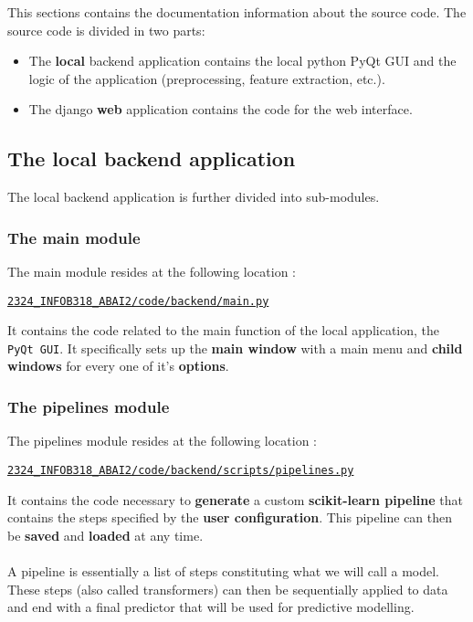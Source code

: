 \label{sec:source-code-documentation}
This sections contains the documentation information about the source code. The source code is divided in two parts:

\begin{itemize}
    \item The \textbf{local} backend application contains the local python PyQt GUI and the logic of the application (preprocessing, feature extraction, etc.).
    \item The django \textbf{web} application contains the code for the web interface.
\end{itemize}
\subsection{The local backend application}
The local backend application is further divided into sub-modules.

\subsubsection{The main module}
The main module resides at the following location : 
\begin{codebox}
    \large\href{https://github.com/UNamurCSFaculty/2324_INFOB318_ABAI2/blob/main/code/backend/main.py}{\texttt{2324\_INFOB318\_ABAI2/code/backend/main.py}}
\end{codebox}
It contains the code related to the main function of the local application, the \texttt{PyQt GUI}. It specifically sets up the \textbf{main window} with a main menu and \textbf{child windows} for every one of it's \textbf{options}.

\subsubsection{The pipelines module}
\label{subsubsec:pipelines}
The pipelines module resides at the following location : 
\begin{codebox}
    \large\href{https://github.com/UNamurCSFaculty/2324_INFOB318_ABAI2/blob/main/code/backend/scripts/pipelines.py}{\texttt{2324\_INFOB318\_ABAI2/code/backend/scripts/pipelines.py}}
\end{codebox}
It contains the code necessary to \textbf{generate} a custom \textbf{scikit-learn pipeline} that contains the steps specified by the \textbf{user configuration}. This pipeline can then be \textbf{saved} and \textbf{loaded} at any time.\\\\ A pipeline is essentially a list of steps constituting what we will call a model. These steps (also called transformers) can then be sequentially applied to data and end with a final predictor that will be used for predictive modelling.

